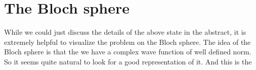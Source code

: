\section{The Bloch sphere}

While we could just discuss the details of the above state in the abstract, it is extremely helpful to visualize the problem on the Bloch sphere. The idea of the Bloch sphere is that the we have a complex wave function of well defined norm. So it seems quite natural to look for a good representation of it. And this is the 
